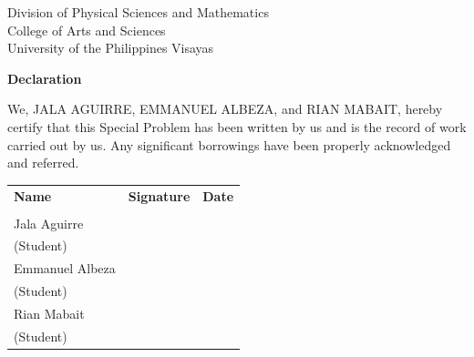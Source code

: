 
\begin{center}
Division of Physical Sciences and Mathematics\\
College of Arts and Sciences\\
University of the Philippines Visayas

\textbf{Declaration}
\end{center}

We, JALA AGUIRRE, EMMANUEL ALBEZA, and RIAN MABAIT, hereby certify that this Special Problem has been written by us and is the record of work carried out by us. Any significant borrowings have been properly acknowledged and referred.

\begin{tabular}{lll}
\bfseries Name & \bfseries Signature & \bfseries Date\\ \\
Jala Aguirre & \signaturerule & \signaturerule\\
\multicolumn{1}{l}{(Student)}\\
Emmanuel Albeza & \signaturerule & \signaturerule\\
\multicolumn{1}{l}{(Student)}\\
Rian Mabait & \signaturerule & \signaturerule\\
\multicolumn{1}{l}{(Student)}
\end{tabular}
